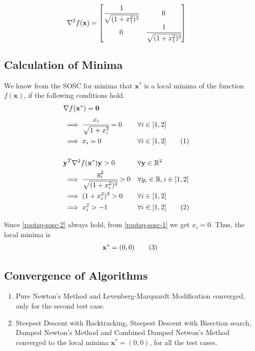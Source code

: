 \documentclass[a4paper]{article}
\newcommand\numberthis{\addtocounter{equation}{1}\tag{\theequation}}
\begin{document}
\begin{align*}
\nabla^2 f(\textbf{x}) &=
    \begin{bmatrix}
        \cfrac{1}{\sqrt{(1 + x_1^2)^3}} & 0 \\
        0 & \cfrac{1}{\sqrt{(1 + x_1^2)^3}} \\
    \end{bmatrix}
\end{align*}

\subsection{Calculation of Minima}

We know from the SOSC for minima that $\textbf{x}^*$ is a local minima of the function $f(\textbf{x})$, if the following conditions hold.
\begin{align*}
&\nabla f(\textbf{x}^*) = \textbf{0} \\
&\implies \cfrac{x_i}{\sqrt{1 + x_i^2}} = 0 &&\forall i \in [1, 2] \\
&\implies x_i = 0 &&\forall i \in [1, 2] \numberthis \label{rootsq-sosc-1} \\ \\
&\textbf{y}^T \nabla^2 f(\textbf{x}^*) \textbf{y} > 0 &&\forall \textbf{y} \in \mathbb{R}^2 \\
&\implies \cfrac{y_i^2}{\sqrt{(1 + x_i^2)^3}} > 0 &&\forall y_i \in \mathbb{R}, i \in [1, 2] \\
&\implies (1 + x_i^2)^3 > 0 &&\forall i \in [1, 2] \\
&\implies x_i^2 > -1 &&\forall i \in [1, 2] \numberthis \label{rootsq-sosc-2}
\end{align*}

Since \eqref{rootsq-sosc-2} always hold, from \eqref{rootsq-sosc-1} we get $x_i = 0$. Thus, the local minima is
\begin{align*}
\textbf{x}^* = (0, 0) \numberthis \label{rootsq-minima}
\end{align*}

\subsection{Convergence of Algorithms}

\begin{enumerate}

\item Pure Newton's Method and Levenberg-Marquardt Modification converged, only for the second test case.

\item Steepest Descent with Backtracking, Steepest Descent with Bisection search, Damped Newton's Method and Combined Damped Netwon's Method converged to the local minima $\textbf{x}^* = (0, 0)$, for all the test cases.

\end{enumerate}
\end{document}
